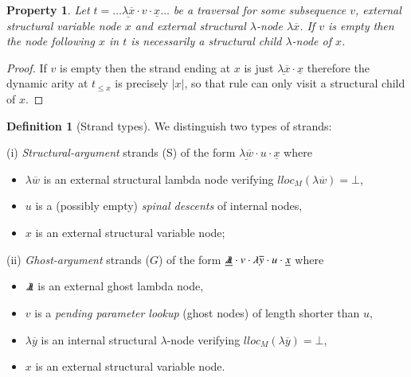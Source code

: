 \documentclass{elsarticle}
\makeatletter
\theoremstyle{plain}
\newtheorem{property}[theorem]{Property}
\theoremstyle{definition}
\newtheorem{definition}{Definition}[section]
\newcommand{\ghostlmd}{{\lambda\mkern-7mu \lambda}}
\renewcommand\ie{{\it i.e.\@\xspace}}
\makeatother
\begin{document}
\begin{property}
\label{prop:strand_spinaldescent}
Let $t= \ldots \underline{\lambda \overline{x}} \cdot v \cdot \underline{x} \ldots$
be a traversal
for some subsequence $v$,
 external structural variable node $x$
 and external structural $\lambda$-node $\lambda \overline{x}$.
If $v$ is empty then the node following $x$ in $t$ is necessarily a structural child $\lambda$-node of $x$.
\end{property}
\begin{proof}
 If $v$ is empty then the strand ending at $x$
 is just $\underline{\lambda \overline{x}} \cdot \underline{x}$ therefore
 the dynamic arity at $t_{\leq x}$ is precisely $|x|$, so that rule  can only visit a structural child of $x$.
\end{proof}

\begin{definition}[Strand types]
    \label{def:strandtypes}
    We distinguish two types of strands:

      \noindent (i) \emph{Structural-argument} strands (S) of the form $\underline{\lambda\overline{w}} \cdot u \cdot \underline{x}$
            where
            \begin{itemize}[nosep]
            \item $\lambda\overline{w}$ is an external structural lambda node verifying $lloc_M(\lambda\overline{w}) = \bot$,
            \item $u$ is a (possibly empty) \emph{spinal descents} of internal nodes,
            \item $x$ is an external structural variable node;
            \end{itemize}

        \item
        (ii) \emph{Ghost-argument} strands ($G$) of the form $\underline{\ghostlmd} \cdot  v \cdot \lambda\overline{y} \cdot u \cdot \underline{x}$
        where
        \begin{itemize}[nosep]
            \item $\ghostlmd$ is an external ghost lambda node,
            \item $v$ is a \emph{pending parameter lookup} (ghost nodes) of length shorter than $u$,
            \item $\lambda\overline{y}$ is an internal structural $\lambda$-node verifying $lloc_M(\lambda\overline{y}) = \bot$,
            \item $x$ is an external structural variable node.
        \end{itemize}
\end{definition}
\end{document}
